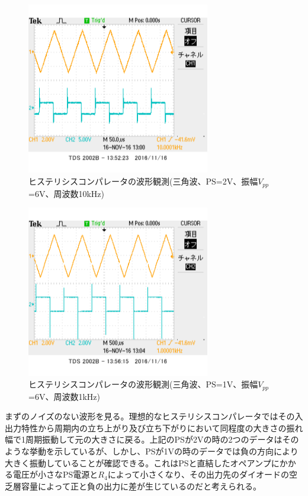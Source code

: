 \documentclass[11pt,a4j]{jsarticle}
\begin{document}
 \begin{figure}[htbp]
  \centering
  \includegraphics[width=8cm,clip]{1_2_histeri_Vth2f10V6sankaku_ViVo.png}
  \caption{ヒステリシスコンパレータの波形観測(三角波、PS=2V、振幅$V_{pp}$=6V、周波数10kHz)}
  \label{fig:histeri_2-10}
 \end{figure}
 
 \begin{figure}[htbp]
  \centering
  \includegraphics[width=8cm,clip]{1_2_histeri_Vth1f1V6sankaku_ViVo.png}
  \caption{ヒステリシスコンパレータの波形観測(三角波、PS=1V、振幅$V_{pp}$=6V、周波数1kHz)}
  \label{fig:histeri_1-1}
 \end{figure}
 	
 	まずのノイズのない波形を見る。理想的なヒステリシスコンパレータではその入出力特性から周期内の立ち上がり及び立ち下がりにおいて同程度の大きさの振れ幅で1周期振動して元の大きさに戻る。上記のPSが2Vの時の2つのデータはそのような挙動を示しているが、しかし、PSが1Vの時のデータでは負の方向により大きく振動していることが確認できる。これはPSと直結したオペアンプにかかる電圧が小さなPS電源と$R_4$によって小さくなり、その出力先のダイオードの空乏層容量によって正と負の出力に差が生じているのだと考えられる。
 	
\end{document}
